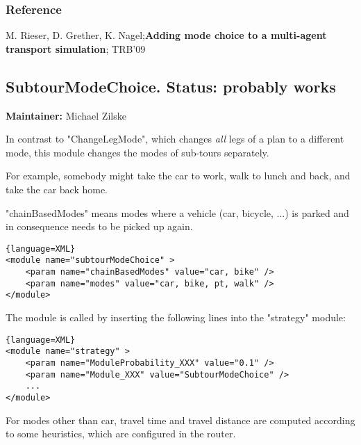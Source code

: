 \subsubsection{Reference}

M. Rieser, D. Grether, K. Nagel;\textbf{Adding mode choice to a multi-agent transport simulation}; TRB'09

\subsection{SubtourModeChoice. Status: probably works}

\textbf{Maintainer:} Michael Zilske

In contrast to "ChangeLegMode", which changes \emph{all} legs of a plan to a different mode, this module changes the modes of sub-tours separately.

For example, somebody might take the car to work, walk to lunch and back, and take the car back home.

"chainBasedModes" means modes where a vehicle (car, bicycle,  ...) is parked and in consequence needs to be picked up again.
\begin{lstlisting}{language=XML}
<module name="subtourModeChoice" >
    <param name="chainBasedModes" value="car, bike" />
    <param name="modes" value="car, bike, pt, walk" />
</module>
\end{lstlisting}


The module is called by inserting the following lines into the "strategy" module:
\begin{lstlisting}{language=XML}
<module name="strategy" >
    <param name="ModuleProbability_XXX" value="0.1" />
    <param name="Module_XXX" value="SubtourModeChoice" />
    ...
</module>
\end{lstlisting}


For modes other than car, travel time and travel distance are  computed according to some heuristics, which are configured in the  router.

\vfill\eject


